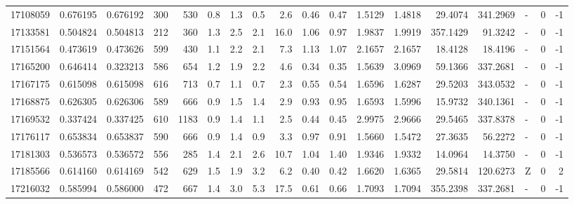 \begin{tabular}{rrrrrrrrrrrrrrrlrr}
  17108059 & 0.676195 &   0.676192 &  300 &  530 &      0.8 &      1.3 &     0.5 &      2.6 &       0.46 &        0.47 &  1.5129 &  1.4818 &   29.4074 &  341.2969 &             - &        0 &         -1 \\
  17133581 & 0.504824 &   0.504813 &  212 &  360 &      1.3 &      2.5 &     2.1 &     16.0 &       1.06 &        0.97 &  1.9837 &  1.9919 &  357.1429 &   91.3242 &             - &        0 &         -1 \\
  17151564 & 0.473619 &   0.473626 &  599 &  430 &      1.1 &      2.2 &     2.1 &      7.3 &       1.13 &        1.07 &  2.1657 &  2.1657 &   18.4128 &   18.4196 &             - &        0 &         -1 \\
  17165200 & 0.646414 &   0.323213 &  586 &  654 &      1.2 &      1.9 &     2.2 &      4.6 &       0.34 &        0.35 &  1.5639 &  3.0969 &   59.1366 &  337.2681 &             - &        0 &         -1 \\
  17167175 & 0.615098 &   0.615098 &  616 &  713 &      0.7 &      1.1 &     0.7 &      2.3 &       0.55 &        0.54 &  1.6596 &  1.6287 &   29.5203 &  343.0532 &             - &        0 &         -1 \\
  17168875 & 0.626305 &   0.626306 &  589 &  666 &      0.9 &      1.5 &     1.4 &      2.9 &       0.93 &        0.95 &  1.6593 &  1.5996 &   15.9732 &  340.1361 &             - &        0 &         -1 \\
  17169532 & 0.337424 &   0.337425 &  610 & 1183 &      0.9 &      1.4 &     1.1 &      2.5 &       0.44 &        0.45 &  2.9975 &  2.9666 &   29.5465 &  337.8378 &             - &        0 &         -1 \\
  17176117 & 0.653834 &   0.653837 &  590 &  666 &      0.9 &      1.4 &     0.9 &      3.3 &       0.97 &        0.91 &  1.5660 &  1.5472 &   27.3635 &   56.2272 &             - &        0 &         -1 \\
  17181303 & 0.536573 &   0.536572 &  556 &  285 &      1.4 &      2.1 &     2.6 &     10.7 &       1.04 &        1.40 &  1.9346 &  1.9332 &   14.0964 &   14.3750 &             - &        0 &         -1 \\
  17185566 & 0.614160 &   0.614169 &  542 &  629 &      1.5 &      1.9 &     3.2 &      6.2 &       0.40 &        0.42 &  1.6620 &  1.6365 &   29.5814 &  120.6273 &             Z &        0 &          2 \\
  17216032 & 0.585994 &   0.586000 &  472 &  667 &      1.4 &      3.0 &     5.3 &     17.5 &       0.61 &        0.66 &  1.7093 &  1.7094 &  355.2398 &  337.2681 &             - &        0 &         -1 \\

\end{tabular}
